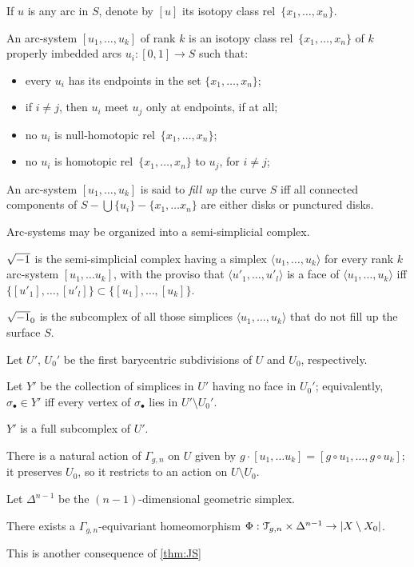 If $u$ is any arc in $S$, denote by $[u]$ its isotopy class rel~$\{x_1,
\ldots, x_n\}$.
\begin{definition}
  An arc-system $[u_1, \ldots, u_k]$ of rank $k$ is an isotopy class
  rel~$\{x_1, \ldots, x_n\}$ of $k$ properly imbedded arcs $u_i : [0,1] \to S$
  such that:
  \begin{itemize}
  \item every $u_i$ has its endpoints in the set $\{x_1, \ldots, x_n\}$;
  \item if $i \neq j$, then $u_i$ meet $u_j$ only at endpoints, if at all;
  \item no $u_i$ is null-homotopic rel~$\{x_1, \ldots, x_n\}$;
  \item no $u_i$ is homotopic rel~$\{x_1, \ldots, x_n\}$ to $u_j$, for $i \neq
    j$;
  \end{itemize}
  An arc-system $[u_1, \ldots, u_k]$ is said to \emph{fill up} the curve
  $S$ iff all connected components of $S - \bigcup\{u_i\} - \{x_1,\ldots x_n\}$ are
  either disks or punctured disks.
\end{definition}

Arc-systems may be organized into a semi-simplicial complex.
\begin{definition}
  $\sqrt{-1}$ is the semi-simplicial complex having a simplex $\langle u_1, \ldots, u_k\rangle$
  for every rank $k$ arc-system $[u_1, \ldots u_k]$, with the proviso that
  $\langle u'_1, \ldots, u'_l\rangle$ is a face of $\langle u_1, \ldots, u_k\rangle$ iff $\{ [u'_1], \ldots,
  [u'_l] \} \subset \{ [u_1], \ldots, [u_k] \}$.
  
  $\sqrt{-1}_0$ is the subcomplex of all those simplices $\langle u_1, \ldots, u_k\rangle$
  that do not fill up the surface $S$.
\end{definition}

Let $U'$, $U_0'$ be the first barycentric subdivisions of $U$
and $U_0$, respectively.

\begin{definition}
  Let $Y'$ be the collection of simplices in $U'$ having no face in
  $U_0'$; equivalently, $\sigma_\bullet \in Y'$ iff every vertex of $\sigma_\bullet$
  lies in $U' \setminus U_0'$.
\end{definition}
$Y'$ is a full subcomplex of $U'$.

There is a natural action of $\Gamma_{g,n}$ on $U$ given by $g \cdot [u_1, \ldots
u_k] = [g \circ u_1, \ldots, g \circ u_k]$; it preserves $U_0$, so it restricts to
an action on $U \setminus U_0$.

Let $\Delta^{n-1}$ be the $(n-1)$-dimensional geometric simplex.
\begin{theorem}
There exists a $\Gamma_{g,n}$-equivariant homeomorphism $\Phi: \mathcal{T}_{g,n} \times
\Delta^{n-1} \to |X \setminus X_0|$.
\end{theorem}
This is another consequence of \ref{thm:JS}


